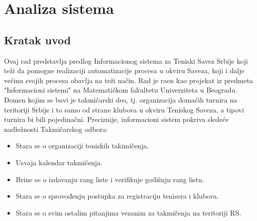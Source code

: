 \documentclass{article}
\begin{document}
\section{Analiza sistema}
\subsection{Kratak uvod}
Ovaj rad predstavlja predlog Informacionog sistema za Teniski Savez Srbije koji teži da pomogne realizaciji automatizacije procesa u okviru Saveza, koji i dalje većinu svojih procesa obavlja na teži način. Rad je ra\dj en kao projekat iz predmeta "Informacioni sistemi" na Matematičkom fakultetu Univerziteta u Beogradu. Domen kojim se bavi je takmičarski deo, tj. organizacija domaćih turnira na teritoriji Srbije i to samo od strane klubova u okviru Teniskog Saveza, a tipovi turnira bi bili pojedinačni. 
Preciznije, informacioni sistem pokriva sledeće nadležnosti Takmičarskog odbora:
\begin{itemize}
\item Stara se o organizaciji teniskih takimičenja.
\item Usvaja kalendar takmičenja.
\item Brine se o izdavanju rang liste i verifikuje godišnju rang listu.
\item Stara se o sprovođenju postupka za registraciju tenisera i klubova.
\item Stara se o svim ostalim pitanjima vezanim za takmičenja na teritoriji RS.   
\end{itemize}
\end{document}
